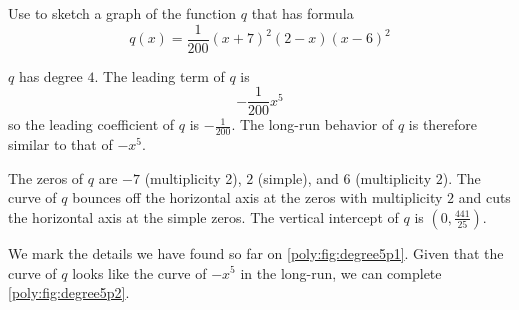 \begin{pccexample}\label{poly:ex:degree5}
Use  to sketch a graph of the function $q$ 
that has formula
\[
    q(x)=\frac{1}{200}(x+7)^2(2-x)(x-6)^2
\]
\begin{pccsolution}
    \begin{steps}
        \item $q$ has degree $4$. The leading term of $q$ is 
         \[
         -\frac{1}{200}x^5
         \]
         so the leading coefficient of $q$ is $-\frac{1}{200}$. The long-run behavior of $q$
         is therefore similar to that of $-x^5$.
        \item The zeros of $q$ are $-7$ (multiplicity 2), $2$ (simple), and $6$ (multiplicity $2$).
         The curve of $q$ bounces off the horizontal axis at the zeros with multiplicity $2$ and
         cuts the horizontal axis at the simple zeros. The vertical intercept of $q$ is $\left( 0,\frac{441}{25} \right)$.
        \item We mark the details we have found so far on \cref{poly:fig:degree5p1}. Given that 
         the curve of $q$ looks like the curve of $-x^5$ in the long-run, we can complete \cref{poly:fig:degree5p2}.
    \end{steps}


\end{pccsolution}
\end{pccexample}
